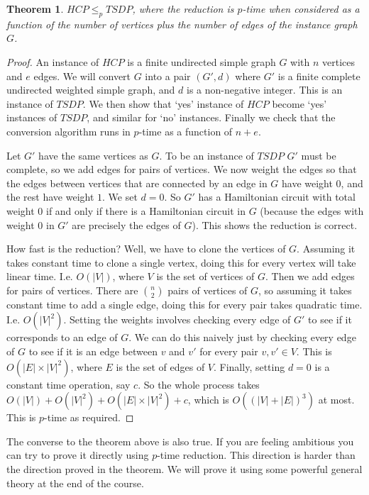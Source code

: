 \documentclass{article}
\theoremstyle{plain}
\newtheorem{theorem}{Theorem}[section]{\bfseries}{\itshape}
\theoremstyle{definition}
\begin{document}
\begin{theorem}\label{T:TSDPtoHCP}
$HCP\leq_p TSDP$, where the reduction is $p$-time when considered as a function of the number of vertices plus the number of edges of the instance graph $G$.
\end{theorem}
\begin{proof}
An instance of $HCP$ is a finite undirected simple graph $G$ with $n$ vertices and $e$ edges. We will convert $G$ into a pair $(G',d)$ where $G'$ is a finite complete undirected weighted simple graph, and $d$ is a non-negative integer. This is an instance of $TSDP$. We then show that `yes' instance of $HCP$ become `yes' instances of $TSDP$, and similar for `no' instances. Finally we check that the conversion algorithm runs in $p$-time as a function of $n+e$.

Let $G'$ have the same vertices as $G$. To be an instance of $TSDP$ $G'$ must be complete, so we add edges for pairs of vertices. We now weight the edges so that the edges between vertices that are connected by an edge in $G$ have weight 0, and the rest have weight $1$. We set $d=0$. So $G'$ has a Hamiltonian circuit with total weight 0 if and only if there is a Hamiltonian circuit in $G$ (because the edges with weight 0 in $G'$ are precisely the edges of $G$). This shows the reduction is correct.

How fast is the reduction? Well, we have to clone the vertices of $G$. Assuming it takes constant time to clone a single vertex, doing this for every vertex will take linear time. I.e. $O(|V|)$, where $V$ is the set of vertices of $G$. Then we add edges for pairs of vertices. There are $n \choose 2$ pairs of vertices of $G$, so assuming it takes constant time to add a single edge, doing this for every pair takes quadratic time. I.e. $O(|V|^2)$. Setting the weights involves checking every edge of $G'$ to see if it corresponds to an edge of $G$. We can do this naively just by checking every edge of $G$ to see if it is an edge between $v$ and $v'$ for every pair $v,v'\in V$. This is $O(|E|\times|V|^2)$, where $E$ is the set of edges of $V$. Finally, setting $d=0$ is a constant time operation, say $c$. So the whole process takes $O(|V|)+O(|V|^2)+O(|E|\times|V|^2)+c$, which is $O((|V|+|E|)^3)$ at most. This is $p$-time as required.  
\end{proof}

The converse to the theorem above is also true. If you are feeling ambitious you can try to prove it directly using $p$-time reduction. This direction is harder than the direction proved in the theorem. We will prove it using some powerful general theory at the end of the course.
\end{document}
